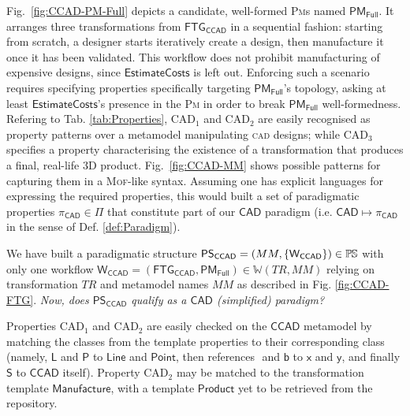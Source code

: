 Fig.~\ref{fig:CCAD-PM-Full} depicts a candidate, well-formed \textsc{Pm}s 
named $\mathsf{PM_{Full}}$.
It arranges three transformations from $\mathsf{FTG_{CCAD}}$ in a sequential 
fashion: starting from scratch, a designer starts iteratively create a
design, then manufacture it once it has been validated. This workflow does not 
prohibit manufacturing of expensive designs, since $\mathsf{EstimateCosts}$ is 
left out.
Enforcing such a scenario requires specifying properties specifically targeting 
$\mathsf{PM_{Full}}$'s topology, asking at least $\mathsf{EstimateCosts}$'s 
presence in the \textsc{Pm} in order to break $\mathsf{PM_{Full}}$ 
well-formedness.
%
Refering to Tab. \ref{tab:Properties}, $\mbox{CAD}_1$ and $\mbox{CAD}_2$ are 
easily recognised as property 
patterns over a metamodel manipulating \textsc{cad} designs; while 
$\mbox{CAD}_3$ specifies a property characterising the existence of a 
transformation that produces a final, real-life 3D product. Fig.~\ref{fig:CCAD-MM} 
shows possible patterns for capturing them in a 
\textsc{Mof}-like syntax. Assuming one has explicit languages 
for expressing the required properties, this would built a set of 
paradigmatic properties $\pi_{\mathsf{CAD}}\in\Pi$ that constitute part of 
our $\mathsf{CAD}$ paradigm (i.e. $\mathsf{CAD} \mapsto \pi_{\mathsf{CAD}}$ in 
the sense of Def. \ref{def:Paradigm}).


We have built a paradigmatic structure $\mathsf{PS_{CCAD}} = (MM, 
\{\mathsf{W_{CCAD}}\})\in\mathbb{P}\mskip-1mu\mathbb{S}$ with only one workflow $\mathsf{W_{CCAD}} = 
(\mathsf{FTG_{CCAD}}, \mathsf{PM_{Full}})\in\mathbb{W}(TR, MM)$ relying on 
transformation $TR$ and metamodel names $MM$ as described in Fig. 
\ref{fig:CCAD-FTG}. \emph{Now, does $\mathsf{PS_{CCAD}}$ qualify as a 
$\mathsf{CAD}$ (simplified) paradigm?}

Properties $\mbox{CAD}_1$ and $\mbox{CAD}_2$ are easily checked on the 
$\mathsf{CCAD}$ metamodel by matching the classes from the template properties 
to their corresponding class (namely, $\mathsf{L}$ and $\mathsf{P}$ to 
$\mathsf{Line}$ and $\mathsf{Point}$, then references $\mathsf{}$ and 
$\mathsf{b}$ to $\mathsf{x}$ and $\mathsf{y}$, and finally $\mathsf{S}$ to 
$\mathsf{CCAD}$ itself). Property $\mbox{CAD}_2$ may be matched to the 
transformation template $\mathsf{Manufacture}$, with a template 
$\mathsf{Product}$ yet to be retrieved from the repository.  


